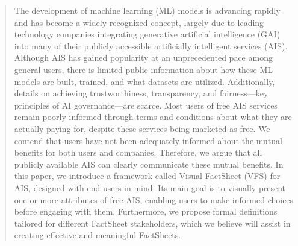 \documentclass[manuscript,screen,review]{acmart}
\begin{document}
\begin{abstract}
  
  The development of machine learning (ML) models is advancing rapidly and has become a widely recognized concept, largely due to leading technology companies integrating generative artificial intelligence (GAI) into many of their publicly accessible artificially intelligent services (AIS). Although AIS has gained popularity at an unprecedented pace among general users, there is limited public information about how these ML models are built, trained, and what datasets are utilized. Additionally, details on achieving trustworthiness, transparency, and fairness—key principles of AI governance—are scarce. Most users of free AIS services remain poorly informed through terms and conditions about what they are actually paying for, despite these services being marketed as free. We contend that users have not been adequately informed about the mutual benefits for both users and companies. Therefore, we argue that all publicly available AIS can clearly communicate these mutual benefits. In this paper, we introduce a framework called Visual FactSheet (VFS) for AIS, designed with end users in mind. Its main goal is to visually present one or more attributes of free AIS, enabling users to make informed choices before engaging with them. Furthermore, we propose formal definitions tailored for different FactSheet stakeholders, which we believe will assist in creating effective and meaningful FactSheets.
  
\end{abstract}
\end{document}
